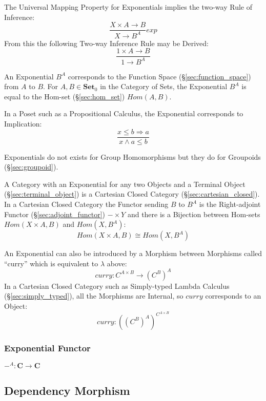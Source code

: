 The Universal Mapping Property for Exponentials implies the two-way
Rule of Inference:
\[
  {
    \frac{X \times A \rightarrow B}
    {X \rightarrow B^A}
  }exp
\]
From this the following Two-way Inference Rule may be Derived:
\[
    \frac{1 \times A \rightarrow B}
    {1 \rightarrow B^A}
\]

An Exponential $B^A$ corresponds to the Function Space
(\S\ref{sec:function_space}) from $A$ to $B$. For $A,B \in
\mathbf{Set}_0$ in the Category of Sets, the Exponential $B^A$ is
equal to the Hom-set (\S\ref{sec:hom_set}) $Hom(A,B)$.

In a Poset such as a Propositional Calculus, the Exponential
corresponds to Implication:
\[
    \frac{x \leq b \Rightarrow a}
    {x \wedge a \leq b}
\]

Exponentials do not exists for Group Homomorphisms but they do for
Groupoids (\S\ref{sec:groupoid}).

A Category with an Exponential for any two Objects and a Terminal
Object (\S\ref{sec:terminal_object}) is a Cartesian Closed Category
(\S\ref{sec:cartesian_closed}). In a Cartesian Closed Category the
Functor sending $B$ to $B^A$ is the Right-adjoint Functor
(\S\ref{sec:adjoint_functor}) $- \times Y$ and there is a Bijection
between Hom-sets $Hom(X \times A, B)$ and $Hom(X, B^A)$:
\[
  Hom(X \times A, B) \cong Hom(X, B^A)
\]

An Exponential can also be introduced by a Morphism between Morphisms
called ``curry'' which is equivalent to $\lambda$ above:
\[
  curry : C^{A \times B} \rightarrow (C^B)^A
\]
In a Cartesian Closed Category such as Simply-typed Lambda Calculus
(\S\ref{sec:simply_typed}), all the Morphisms are Internal, so $curry$
corresponds to an Object:
\[
  curry : ((C^B)^A)^{C^{A \times B}}
\]



\subsubsection{Exponential Functor}\label{sec:exponential_functor}

$-^A : \mathbf{C} \rightarrow \mathbf{C}$



\subsection{Dependency Morphism}\label{sec:dependency_morphism}


